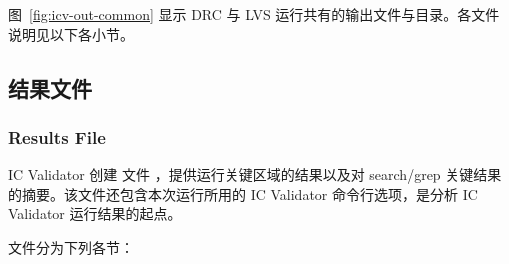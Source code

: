 图~\ref{fig:icv-out-common} 显示 DRC 与 LVS 运行共有的输出文件与目录。各文件说明见以下各小节。


\subsection{结果文件}
\subsubsection*{Results File}

IC Validator 创建  文件 ，提供运行关键区域的结果以及对 search/grep 关键结果的摘要。该文件还包含本次运行所用的 IC Validator 命令行选项，是分析 IC Validator 运行结果的起点。

 文件分为下列各节：

